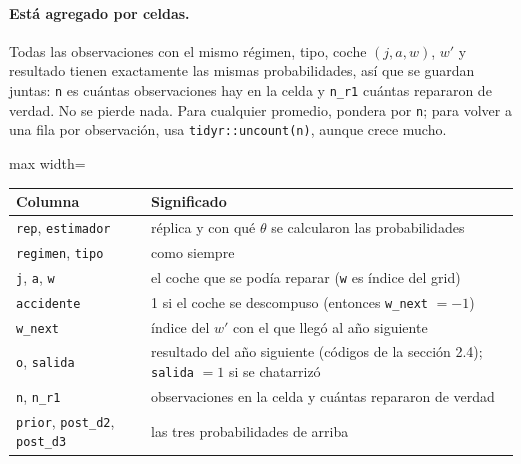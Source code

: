\documentclass[11pt]{article}
\newcommand{\col}[1]{\texttt{#1}}
\begin{document}
\paragraph{Está agregado por celdas.} Todas las observaciones con el mismo régimen, tipo,
coche $(j,a,w)$, $w'$ y resultado tienen exactamente las mismas probabilidades, así que se
guardan juntas: \col{n} es cuántas observaciones hay en la celda y \col{n\_r1} cuántas
repararon de verdad. No se pierde nada. Para cualquier promedio, pondera por \col{n}; para
volver a una fila por observación, usa \texttt{tidyr::uncount(n)}, aunque crece mucho.

\begin{center}\small
\begin{adjustbox}{max width=\textwidth}\begin{tabular}{ll}
\toprule
Columna & Significado\\
\midrule
\col{rep}, \col{estimador} & réplica y con qué $\theta$ se calcularon las probabilidades\\
\col{regimen}, \col{tipo} & como siempre\\
\col{j}, \col{a}, \col{w} & el coche que se podía reparar (\col{w} es índice del grid)\\
\col{accidente} & 1 si el coche se descompuso (entonces \col{w\_next} $=-1$)\\
\col{w\_next} & índice del $w'$ con el que llegó al año siguiente\\
\col{o}, \col{salida} & resultado del año siguiente (códigos de la sección 2.4); \col{salida} $=1$ si se chatarrizó\\
\col{n}, \col{n\_r1} & observaciones en la celda y cuántas repararon de verdad\\
\col{prior}, \col{post\_d2}, \col{post\_d3} & las tres probabilidades de arriba\\
\bottomrule
\end{tabular}\end{adjustbox}
\end{center}
\end{document}
